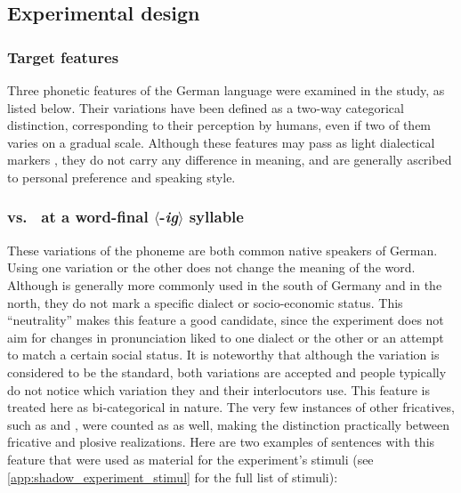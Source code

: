 \subsection{Experimental design}
\label{subsec:design_HCIConv}

\subsubsection{Target features}
\label{subsubsec:target_features_HCIConv}

Three phonetic features of the German language were examined in the study, as listed below.
Their variations have been defined as a two-way categorical distinction, corresponding to their perception by humans, even if two of them varies on a gradual scale.
Although these features may pass as light dialectical markers \citep{Mitterer2013regional}, they do not carry any difference in meaning, and are generally ascribed to personal preference and speaking style.

\subsubsection*{\textipa{[\c{c}]} vs.\ \textipa{[k]} at a word-final $\langle$-\textit{ig}$\rangle$ syllable}

These variations of the phoneme \textipa{[\c{c}]} are both common native speakers of German.
Using one variation or the other does not change the meaning of the word.
Although \textipa{[\c{c}]} is generally more commonly used in the south of Germany and \textipa{[k]} in the north, they do not mark a specific dialect or socio-economic status.
This \enquote{neutrality} makes this feature a good candidate, since the experiment does not aim for changes in pronunciation liked to one dialect or the other or an attempt to match a certain social status.
It is noteworthy that although the \textipa{[\c{c}]} variation is considered to be the standard, both variations are accepted and people typically do not notice which variation they and their interlocutors use.
This feature is treated here as bi-categorical in nature.
The very few instances of other fricatives, such as \textipa{[S]} and \textipa{[J]}, were counted as \textipa{[\c{c}]} as well, making the distinction practically between fricative and plosive realizations.
Here are two examples of sentences with this feature that were used as material for the experiment's stimuli (see \autoref{app:shadow_experiment_stimul} for the full list of stimuli):
	
